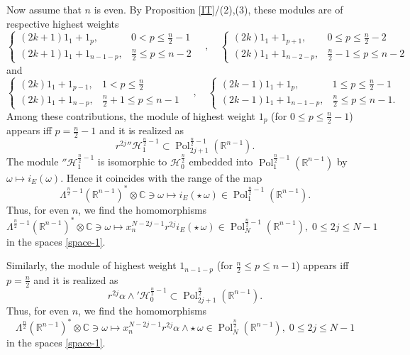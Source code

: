 \documentclass[a4paper,12pt,reqno]{amsart}
\numberwithin{theorem}{subsection}
\numberwithin{equation}{section}
\begin{document}
Now assume that $n$ is even. By Proposition \ref{IT}/(2),(3), these modules are
of respective highest weights
$$
   \begin{cases}
   (2k+1) 1_1 + 1_p, & 0 < p \le \frac{n}{2}-1 \\
   (2k+1) 1_1 + 1_{n-1-p}, & \frac{n}{2} \le p \le n-2
   \end{cases}
   \quad , \quad
   \begin{cases}
   (2k) 1_1 + 1_{p+1}, & 0 \le p \le \frac{n}{2}-2 \\
   (2k) 1_1 + 1_{n-2-p}, & \frac{n}{2}-1 \le p \le n-2
   \end{cases}
$$
and
$$
   \begin{cases}
   (2k) 1_1 + 1_{p-1}, & 1 < p \le \frac{n}{2} \\
   (2k) 1_1 + 1_{n-p}, & \frac{n}{2}+1 \le p \le n-1
   \end{cases}
   \quad , \quad
   \begin{cases}
   (2k-1) 1_1 + 1_p, & 1 \le p \le \frac{n}{2}-1 \\
   (2k-1) 1_1 + 1_{n-1-p}, & \frac{n}{2} \le p \le n-1.
   \end{cases}
$$
Among these contributions, the module of highest weight $1_p$ (for $0 \le p \le
\frac{n}{2}-1$) appears iff $p=\frac{n}{2}-1$ and it is realized as
$$
   r^{2j} {''{\mathcal H}}_1^{\frac{n}{2}-1} \subset {\operatorname{Pol}}_{2j+1}^{\frac{n}{2}-1}({\mathbb{R}}^{n-1}).
$$
The module ${''{\mathcal H}}_1^{\frac{n}{2}-1}$ is isomorphic to ${\mathcal H}_0^{\frac{n}{2}}$
embedded into ${\operatorname{Pol}}_1^{\frac{n}{2}-1}({\mathbb{R}}^{n-1})$ by $\omega \mapsto
i_E(\omega)$. Hence it coincides with the range of the map
$$
   \Lambda^{\frac{n}{2}-1}({\mathbb{R}}^{n-1})^* \otimes {\mathbb{C}} \ni \omega \mapsto i_E( \star \, \omega) \in
   {\operatorname{Pol}}^{\frac{n}{2}-1}_{1}({\mathbb{R}}^{n-1}).
$$
Thus, for even $n$, we find the homomorphisms
\begin{equation}\label{exotic-1}
   \Lambda^{\frac{n}{2}-1}({\mathbb{R}}^{n-1})^* \otimes {\mathbb{C}} \ni \omega \mapsto
   x_n^{N-2j-1} r^{2j} i_E( \star \, \omega) \in {\operatorname{Pol}}_N^{\frac{n}{2}-1}({\mathbb{R}}^{n-1}), \; 0 \le 2j \le N-1
\end{equation}
in the spaces \eqref{space-1}.

Similarly, the module of highest weight $1_{n-1-p}$ (for $\frac{n}{2} \le p \le
n-1$) appears iff $p=\frac{n}{2}$ and it is realized as
$$
   r^{2j} \alpha \wedge {'{\mathcal H}}_0^{\frac{n}{2}-1} \subset {\operatorname{Pol}}_{2j+1}^{\frac{n}{2}}({\mathbb{R}}^{n-1}).
$$
Thus, for even $n$, we find the homomorphisms
\begin{equation}\label{exotic-2}
    \Lambda^{\frac{n}{2}}({\mathbb{R}}^{n-1})^* \otimes {\mathbb{C}} \ni \omega \mapsto
    x_n^{N-2j-1} r^{2j} \alpha \wedge \star \, \omega \in {\operatorname{Pol}}_N^{\frac{n}{2}}({\mathbb{R}}^{n-1}), \; 0 \le 2j \le N-1
\end{equation}
in the spaces \eqref{space-1}.
\end{document}
